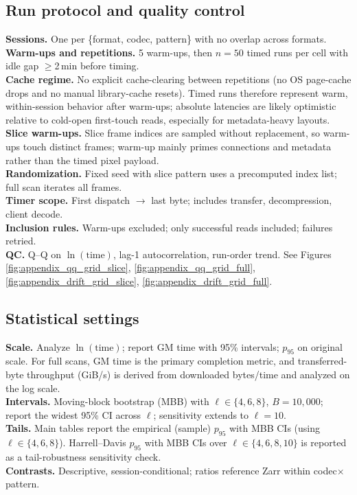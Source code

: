 \documentclass[nomenclature, english, bibtex]{kththesis}
\numberwithin{listing}{chapter}
\begin{document}
\subsection{Run protocol and quality control}
\label{app:a2-run-qc}
\textbf{Sessions.} One per \{format, codec, pattern\} with no overlap across formats.\\
\textbf{Warm-ups and repetitions.} 5 warm-ups, then $n{=}50$ timed runs per cell with idle gap $\ge$2\,min before timing.\\
\textbf{Cache regime.} No explicit cache-clearing between repetitions (no OS page-cache drops and no manual library-cache resets). Timed runs therefore represent warm, within-session behavior after warm-ups; absolute latencies are likely optimistic relative to cold-open first-touch reads, especially for metadata-heavy layouts.\\
\textbf{Slice warm-ups.} Slice frame indices are sampled without replacement, so warm-ups touch distinct frames; warm-up mainly primes connections and metadata rather than the timed pixel payload.\\
\textbf{Randomization.} Fixed seed with slice pattern uses a precomputed index list; full scan iterates all frames.\\
\textbf{Timer scope.} First dispatch $\rightarrow$ last byte; includes transfer, decompression, client decode.\\
\textbf{Inclusion rules.} Warm-ups excluded; only successful reads included; failures retried.\\
\textbf{QC.} Q–Q on $\ln(\text{time})$, lag-1 autocorrelation, run-order trend. See Figures \ref{fig:appendix_qq_grid_slice}, \ref{fig:appendix_qq_grid_full}, \ref{fig:appendix_drift_grid_slice}, \ref{fig:appendix_drift_grid_full}.

\subsection{Statistical settings}
\label{app:a3-stats}
\textbf{Scale.} Analyze $\ln(\text{time})$; report \gls{GM} time with 95\% intervals; $p_{95}$ on original scale. For full scans, \gls{GM} time is the primary completion metric, and transferred-byte throughput (GiB/s) is derived from downloaded bytes/time and analyzed on the log scale.\\
\textbf{Intervals.} Moving-block bootstrap (\gls{MBB}) with $\ell\in\{4,6,8\}$, $B{=}10{,}000$; report the widest 95\% \gls{CI} across $\ell$; sensitivity extends to $\ell{=}10$.\\
\textbf{Tails.} Main tables report the empirical (sample) $p_{95}$ with \gls{MBB} CIs (using $\ell\in\{4,6,8\}$). Harrell–Davis $p_{95}$ with \gls{MBB} CIs over $\ell\in\{4,6,8,10\}$ is reported as a tail-robustness sensitivity check.\\
\textbf{Contrasts.} Descriptive, session-conditional; ratios reference Zarr within codec$\times$pattern.
\end{document}
